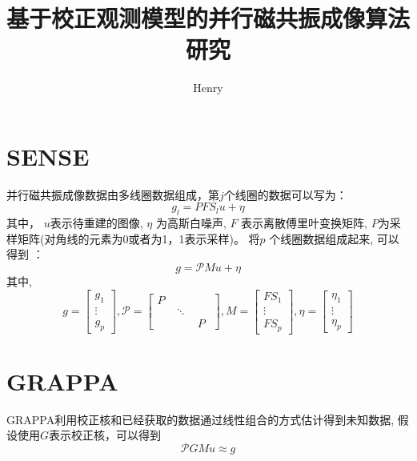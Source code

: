 \documentclass[UTF8]{article}
\begin{document}
\author{Henry}
\title{基于校正观测模型的并行磁共振成像算法研究}
\maketitle


\section{SENSE}
\par 并行磁共振成像数据由多线圈数据组成，第$j$个线圈的数据可以写为：
\begin{equation}\label{eq:coil_equation}
	g_l = PFS_lu + \eta
\end{equation}
其中， $u$表示待重建的图像, $\eta$ 为高斯白噪声, $F$ 表示离散傅里叶变换矩阵,  $P$为采样矩阵(对角线的元素为0或者为1，1表示采样)。 将$p$ 个线圈数据组成起来, 可以得到 ：
\begin{equation}\label{eq:system_equation}
	g = \mathcal{P}Mu + \eta
\end{equation}
其中,
\begin{equation*}
	g = \begin{bmatrix}
		g_1 \\
		\vdots \\
		g_p
	\end{bmatrix},
   \mathcal{P} = \begin{bmatrix}
	   	P & \quad&\quad \\
	   	\quad& \ddots &\quad \\
	   	\quad& \quad& P
   \end{bmatrix},
	M = \begin{bmatrix}
		FS_1 \\
		\vdots \\
		FS_p
	\end{bmatrix},
	\eta =\begin{bmatrix}
		\eta_1 \\
		\vdots \\
		\eta_p
	\end{bmatrix}
\end{equation*}
\section{GRAPPA }
\par GRAPPA利用校正核和已经获取的数据通过线性组合的方式估计得到未知数据, 假设使用$G$表示校正核，可以得到
\begin{equation} \label{GRAPPA_equation}
	\mathcal{P}GMu \approx g
\end{equation}
\end{document}
